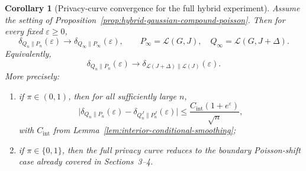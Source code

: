 \documentclass{article}
\newtheorem{corollary}[theorem]{Corollary}
\begin{document}
\begin{corollary}[Privacy-curve convergence for the full hybrid experiment]
\label{cor:full-hybrid-privacy-convergence}
Assume the setting of Proposition~\ref{prop:hybrid-gaussian-compound-poisson}. Then for every fixed $\varepsilon\ge 0$,
\[
\delta_{Q_n\|P_n}(\varepsilon)\longrightarrow \delta_{Q_\infty\|P_\infty}(\varepsilon),
\qquad
P_\infty=\mathcal L(G,J),\quad Q_\infty=\mathcal L(G,J+\Delta).
\]
Equivalently,
\[
\delta_{Q_n\|P_n}(\varepsilon)\longrightarrow \delta_{\mathcal L(J+\Delta)\|\mathcal L(J)}(\varepsilon).
\]
More precisely:
\begin{enumerate}
\item[(i)] if $\pi\in(0,1)$, then for all sufficiently large $n$,
\[
\bigl|\delta_{Q_n\|P_n}(\varepsilon)-\delta_{Q_n^J\|P_n^J}(\varepsilon)\bigr|
\le \frac{C_{\mathrm{int}}(1+e^\varepsilon)}{\sqrt n},
\]
with $C_{\mathrm{int}}$ from Lemma~\ref{lem:interior-conditional-smoothing};
\item[(ii)] if $\pi\in\{0,1\}$, then the full privacy curve reduces to the boundary Poisson-shift case already covered in Sections~3--4.
\end{enumerate}
\end{corollary}
\end{document}
